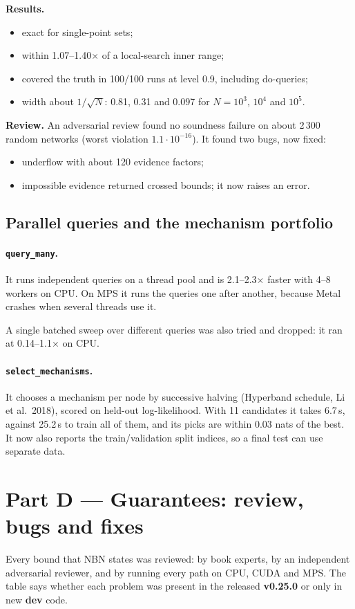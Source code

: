\documentclass[10pt,a4paper]{article}
\newcommand{\code}[1]{\texttt{#1}}
\newcommand{\old}{\textbf{v0.25.0}}
\newcommand{\new}{\textbf{dev}}
\begin{document}
\textbf{Results.}
\begin{itemize}
\item exact for single-point sets;
\item within 1.07--1.40$\times$ of a local-search inner range;
\item covered the truth in 100/100 runs at level 0.9, including do-queries;
\item width about $1/\sqrt N$: 0.81, 0.31 and 0.097 for $N=10^3$, $10^4$ and $10^5$.
\end{itemize}

\textbf{Review.} An adversarial review found no soundness failure on about 2\,300 random
networks (worst violation $1.1\cdot10^{-16}$). It found two bugs, now fixed:
\begin{itemize}
\item underflow with about 120 evidence factors;
\item impossible evidence returned crossed bounds; it now raises an error.
\end{itemize}

\subsection{Parallel queries and the mechanism portfolio}
\paragraph{\code{query\_many}.} It runs independent queries on a thread pool and is 2.1--2.3$\times$ faster with 4--8 workers on CPU. On MPS it runs the queries one after another, because Metal crashes when several threads use it.

A single batched sweep over different queries was also tried and dropped: it ran at 0.14--1.1$\times$ on CPU.

\paragraph{\code{select\_mechanisms}.} It chooses a mechanism per node by successive halving (Hyperband schedule, Li et al.~2018), scored on held-out log-likelihood. With 11 candidates it takes 6.7\,s, against 25.2\,s to train all of them, and its picks are within 0.03 nats of the best. It now also reports the train/validation split indices, so a final test can use separate data.

\section{Part D --- Guarantees: review, bugs and fixes}\label{sec:guar}
Every bound that NBN states was reviewed: by book experts, by an independent adversarial
reviewer, and by running every path on CPU, CUDA and MPS. The table says whether each problem
was present in the released \old{} or only in new \new{} code.
\end{document}
